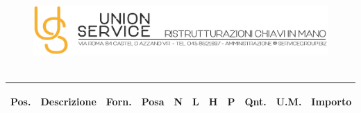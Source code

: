 \documentclass[a4paper]{article}
\begin{document}
                                \begin{figure}[!t]
                                \includegraphics[width=15.8cm, height=3cm]{intestazioneAlta2.jpg}
                                \end{figure}
                                
                                      \noindent\begin{tabular}{ | L{6.1mm} |  L{26mm} | L{11mm} |  L{9mm} | L{6.5mm} | L{6.5mm} | L{6.5mm} | L{6.5mm} | L{8mm} | L{7.7mm} | L{16mm} |  }
                                      \hline
                                \vspace{2.5mm}\begin{spacing}{0}\textbf{Pos.}\end{spacing} &\vspace{2.5mm}\begin{spacing}{0}\textbf{Descrizione}\end{spacing} &\vspace{2.5mm}\begin{spacing}{0}\textbf{Forn.}\end{spacing} &\vspace{2.5mm}\begin{spacing}{0}\textbf{Posa}\end{spacing} &\vspace{2.5mm}\begin{spacing}{0}\textbf{N}\end{spacing} &\vspace{2.5mm}\begin{spacing}{0}\textbf{L}\end{spacing} &\vspace{2.5mm}\begin{spacing}{0}\textbf{H}\end{spacing} &\vspace{2.5mm}\begin{spacing}{0}\textbf{P}\end{spacing} &\vspace{2.5mm}\begin{spacing}{0}\textbf{Qnt.}\end{spacing} &\vspace{2.5mm}\begin{spacing}{0}\textbf{U.M.}\end{spacing} &\vspace{2.5mm}\begin{spacing}{0}\textbf{Importo}
                        \end{spacing} \\ \hline %


\end{tabular}
\end{document}
